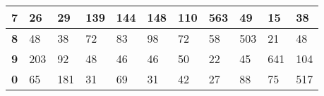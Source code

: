 \documentclass[a4paper]{article}
\begin{document}
\begin{table}[H]
\begin{tabular}{|l|l|l|l|l|l|l|l|l|l|l|}
        \textbf{7} & \cellcolor[HTML]{FFFFFF}26  & \cellcolor[HTML]{FFFFFF}29  & \cellcolor[HTML]{FFFFFF}139 & \cellcolor[HTML]{FFFFFF}144 & \cellcolor[HTML]{FFFFFF}148 & \cellcolor[HTML]{FFFFFF}110 & \cellcolor[HTML]{FFFFFF}563 & \cellcolor[HTML]{FFFFFF}49  & \cellcolor[HTML]{FFFFFF}15  & \cellcolor[HTML]{FFFFFF}38  \\ \hline
        \textbf{8} & \cellcolor[HTML]{FFFFFF}48  & \cellcolor[HTML]{FFFFFF}38  & \cellcolor[HTML]{FFFFFF}72  & \cellcolor[HTML]{FFFFFF}83  & \cellcolor[HTML]{FFFFFF}98  & \cellcolor[HTML]{FFFFFF}72  & \cellcolor[HTML]{FFFFFF}58  & \cellcolor[HTML]{FFFFFF}503 & \cellcolor[HTML]{FFFFFF}21  & \cellcolor[HTML]{FFFFFF}48  \\ \hline
        \textbf{9} & \cellcolor[HTML]{FFFFFF}203 & \cellcolor[HTML]{FFFFFF}92  & \cellcolor[HTML]{FFFFFF}48  & \cellcolor[HTML]{FFFFFF}46  & \cellcolor[HTML]{FFFFFF}46  & \cellcolor[HTML]{FFFFFF}50  & \cellcolor[HTML]{FFFFFF}22  & \cellcolor[HTML]{FFFFFF}45  & \cellcolor[HTML]{FFFFFF}641 & \cellcolor[HTML]{FFFFFF}104 \\ \hline
        \textbf{0} & \cellcolor[HTML]{FFFFFF}65  & \cellcolor[HTML]{FFFFFF}181 & \cellcolor[HTML]{FFFFFF}31  & \cellcolor[HTML]{FFFFFF}69  & \cellcolor[HTML]{FFFFFF}31  & \cellcolor[HTML]{FFFFFF}42  & \cellcolor[HTML]{FFFFFF}27  & \cellcolor[HTML]{FFFFFF}88  & \cellcolor[HTML]{FFFFFF}75  & \cellcolor[HTML]{FFFFFF}517 \\ \hline
    \end{tabular}
\end{table}
\end{document}
